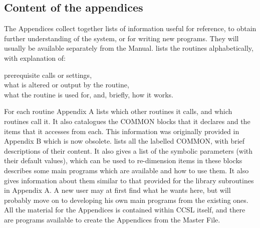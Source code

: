 \subsection{Content of the appendices} 
The Appendices collect together lists of information useful for reference,
to obtain further understanding of the system, or for writing new programs.
They will usually be available separately from the Manual.
\pn 
{} lists the routines 
alphabetically, with explanation of:\pn
\begin{varindent}{3 cm}prerequisite calls or settings,\\
what is altered or output by the routine,\\
what the routine is used for, and, briefly, how it works.\\
\end{varindent}
\pn 
For each routine Appendix A lists which other
routines it calls, and which  routines call it. It also catalogues the COMMON
blocks that it declares and the items that it accesses from each. This
information was originally provided in Appendix B which is now obsolete.
\p 
{} lists all the labelled COMMON, with brief descriptions of 
their content. It also gives a list of the symbolic parameters (with their default values), which can be used 
to re-dimension items in these blocks
\p 
{} describes some main programs which
are available and how to use them. It also gives information about them similar
to that provided for the library subroutines in Appendix A. 
A new user may at first find what he wants here, but will
probably move on to developing his own main programs from the existing ones.
\pn 
All the material for the Appendices is contained within CCSL itself, and
there are programs available to create the Appendices from the Master File.
\p
